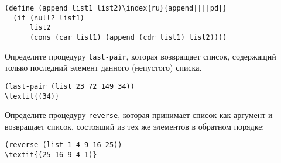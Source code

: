 \begin{Verbatim}[fontsize=\small]
(define (append list1 list2)\index{ru}{append||||pd|}
  (if (null? list1)
      list2
      (cons (car list1) (append (cdr list1) list2))))
\end{Verbatim}
\begin{exercise}{2.17}\label{EX2.17}%
%
Определите процедуру  {\tt last-pair}, которая
возвращает список, содержащий только последний элемент данного
(непустого) списка.

\begin{Verbatim}[fontsize=\small]
(last-pair (list 23 72 149 34))
\textit{(34)}
\end{Verbatim}
\end{exercise}
\begin{exercise}{2.18}\label{EX2.18}%
%
Определите процедуру  
{\tt reverse}, которая
принимает список как аргумент и возвращает список, состоящий из тех же 
элементов в обратном порядке:

\begin{Verbatim}[fontsize=\small]
(reverse (list 1 4 9 16 25))
\textit{(25 16 9 4 1)}
\end{Verbatim}
\end{exercise}
